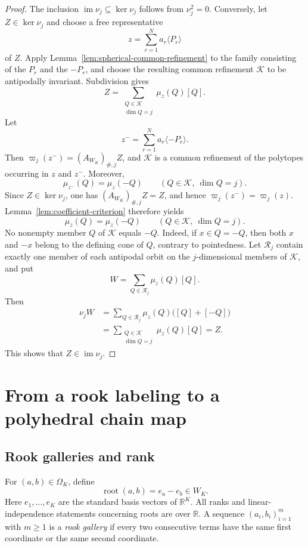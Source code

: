 \documentclass[reqno,12pt]{amsart}
\theoremstyle{definition}
\begin{document}
\begin{proof}
The inclusion \(\operatorname{im}\nu_j\subseteq\ker\nu_j\) follows
from \(\nu_j^2=0\).  Conversely, let \(Z\in\ker\nu_j\) and choose a
free representative
\[
 z=\sum_{r=1}^N a_r\langle P_r\rangle
\]
of \(Z\).  Apply Lemma~\ref{lem:spherical-common-refinement} to the
family consisting of the \(P_r\) and the \(-P_r\), and choose the
resulting common refinement \(\mathcal K\) to be antipodally
invariant.  Subdivision gives
\[
 Z=\sum_{\substack{Q\in\mathcal K\\\dim Q=j}}\mu_z(Q)[Q].
\]
Let
\[
 z^-=\sum_{r=1}^N a_r\langle-P_r\rangle.
\]
Then
\(\varpi_j(z^-)=(A_{W_K})_{\#,j}Z\), and \(\mathcal K\) is a common
refinement of the polytopes occurring in \(z\) and \(z^-\).  Moreover,
\[
 \mu_{z^-}(Q)=\mu_z(-Q)
 \qquad(Q\in\mathcal K,\ \dim Q=j).
\]
Since \(Z\in\ker\nu_j\), one has
\((A_{W_K})_{\#,j}Z=Z\), and hence
\(\varpi_j(z^-)=\varpi_j(z)\).
Lemma~\ref{lem:coefficient-criterion} therefore yields
\[
 \mu_z(Q)=\mu_z(-Q)
 \qquad(Q\in\mathcal K,\ \dim Q=j).
\]
No nonempty member \(Q\) of \(\mathcal K\) equals \(-Q\).  Indeed, if
\(x\in Q=-Q\), then both \(x\) and \(-x\) belong to the defining cone
of \(Q\), contrary to pointedness.  Let \(\mathcal R_j\) contain
exactly one member of each antipodal orbit on the \(j\)-dimensional
members of \(\mathcal K\), and put
\[
 W=\sum_{Q\in\mathcal R_j}\mu_z(Q)[Q].
\]
Then
\[
 \begin{aligned}
 \nu_jW
 &=\sum_{Q\in\mathcal R_j}
   \mu_z(Q)\bigl([Q]+[-Q]\bigr)\\
 &=\sum_{\substack{Q\in\mathcal K\\\dim Q=j}}
   \mu_z(Q)[Q]
 =Z.
 \end{aligned}
\]
This shows that $Z\in\operatorname{im}\nu_j$.
\end{proof}

\section{From a rook labeling to a polyhedral chain map}

\subsection{Rook galleries and rank}

For \((a,b)\in\Omega_K\), define
\begin{equation*}
 \operatorname{root}(a,b)=e_a-e_b\in W_K.
\end{equation*}
Here \(e_1,\ldots,e_K\) are the standard basis vectors of
\(\mathbb R^K\).
All ranks and linear-independence statements concerning roots are over
\(\mathbb R\).
A sequence \((a_i,b_i)_{i=1}^m\) with \(m\geq1\) is a
\emph{rook gallery} if every two
consecutive terms have the same first coordinate or the same second
coordinate.
\end{document}
